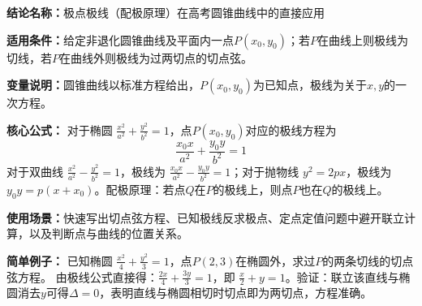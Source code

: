\textbf{结论名称：}极点极线（配极原理）在高考圆锥曲线中的直接应用

\textbf{适用条件：}给定非退化圆锥曲线及平面内一点$P(x_0,y_0)$；若$P$在曲线上则极线为切线，若$P$在曲线外则极线为过两切点的切点弦。

\textbf{变量说明：}圆锥曲线以标准方程给出，$P(x_0,y_0)$为已知点，极线为关于$x,y$的一次方程。

\textbf{核心公式：}
对于椭圆 $\frac{x^2}{a^2}+\frac{y^2}{b^2}=1$，点$P(x_0,y_0)$对应的极线方程为
\[
\boxed{\frac{x_0x}{a^2}+\frac{y_0y}{b^2}=1}
\]
对于双曲线 $\frac{x^2}{a^2}-\frac{y^2}{b^2}=1$，极线为 $\frac{x_0x}{a^2}-\frac{y_0y}{b^2}=1$；对于抛物线 $y^2=2px$，极线为 $y_0y=p(x+x_0)$。配极原理：若点$Q$在$P$的极线上，则点$P$也在$Q$的极线上。

\textbf{使用场景：}快速写出切点弦方程、已知极线反求极点、定点定值问题中避开联立计算，以及判断点与曲线的位置关系。

\textbf{简单例子：}
已知椭圆 $\frac{x^2}{4}+\frac{y^2}{3}=1$，点$P(2,3)$在椭圆外，求过$P$的两条切线的切点弦方程。
由极线公式直接得：$\frac{2x}{4}+\frac{3y}{3}=1$，即 $\frac{x}{2}+y=1$。验证：联立该直线与椭圆消去$y$可得$\Delta=0$，表明直线与椭圆相切时切点即为两切点，方程准确。